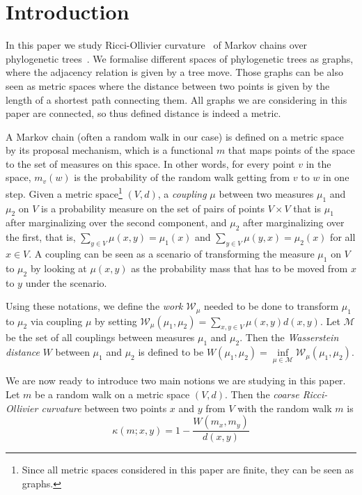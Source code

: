 \documentclass{amsart}
\newcommand{\W}{\mathcal{W}}
\newcommand{\M}{\mathcal{M}}
\begin{document}
\section{Introduction}

In this paper we study Ricci-Ollivier curvature~\cite{Ollivier2009-cj} of Markov chains over phylogenetic trees~\cite{Semple2003-nj}.
We formalise different spaces of phylogenetic trees as graphs, where the adjacency relation is given by a tree move.
Those graphs can be also seen as metric spaces where the distance between two points is given by the length of a shortest path connecting them.
All graphs we are considering in this paper are connected, so thus defined distance is indeed a metric.

A Markov chain (often a random walk in our case) is defined on a metric space by its proposal mechanism, which is a functional $m$ that maps points of the space to the set of measures on this space.
In other words, for every point $v$ in the space, $m_v(w)$ is the probability of the random walk getting from $v$ to $w$ in one step.
Given a metric space\footnote{Since all metric spaces considered in this paper are finite, they can be seen as graphs.}
$(V,d)$, a \emph{coupling} $\mu$ between two measures $\mu_1$ and $\mu_2$ on $V$ is a probability measure on the set of pairs of points $V \times V$ that is $\mu_1$ after marginalizing over the second component, and $\mu_2$ after marginalizing over the first, that is, $\sum\limits_{y \in V}\mu(x,y) = \mu_1(x)$ and $\sum\limits_{y \in V}\mu(y,x) = \mu_2(x)$ for all $x \in V$.
A coupling can be seen as a scenario of transforming the measure $\mu_1$ on $V$ to $\mu_2$ by looking at $\mu(x,y)$ as the probability mass that has to be moved from $x$ to $y$ under the scenario.

Using these notations, we define the {\em work} $\W_\mu$ needed to be done to transform $\mu_1$ to $\mu_2$ via coupling $\mu$ by setting $\W_\mu(\mu_1,\mu_2) = \sum\limits_{x,y\in V}\mu(x,y) d(x,y)$.
Let $\M$ be the set of all couplings between measures $\mu_1$ and $\mu_2$.
Then the {\em Wasserstein distance} $W$ between $\mu_1$ and $\mu_2$ is defined to be $W(\mu_1,\mu_2) = \inf\limits_{\mu\in\M}\W_\mu(\mu_1,\mu_2)$.

We are now ready to introduce two main notions we are studying in this paper.
Let $m$ be a random walk on a metric space $(V,d)$.
Then the {\em coarse Ricci-Ollivier curvature} between two points $x$ and $y$ from $V$ with the random walk $m$ is
\[
\kappa(m;x,y) = 1 - \frac{W(m_x,m_y)}{d(x,y)}
\]
\end{document}
